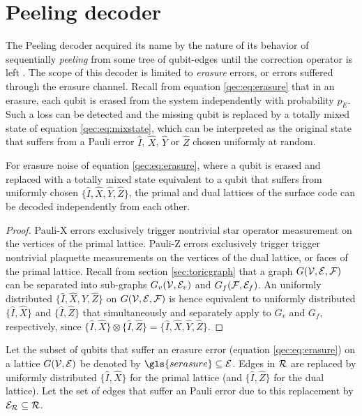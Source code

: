 \section{Peeling decoder}
The Peeling decoder acquired its name by the nature of its behavior of sequentially \emph{peeling} from some tree of qubit-edges until the correction operator is left \cite{delfosse2017linear}. The scope of this decoder is limited to \emph{erasure} errors, or errors suffered through the erasure channel. Recall from equation \eqref{qec:eq:erasure} that in an erasure, each qubit is erased from the system independently with probability $p_E$. Such a loss can be detected and the missing qubit is replaced by a totally mixed state of equation \eqref{qec:eq:mixstate}, which can be interpreted as the original state that suffers from a Pauli error $\hat{I}$, $\hat{X}$, $\hat{Y}$ or $\hat{Z}$ chosen uniformly at random.
\begin{theorem}\label{the:independentxy}
  For erasure noise of equation \eqref{qec:eq:erasure}, where a qubit is erased and replaced with a totally mixed state equivalent to a qubit that suffers from uniformly chosen $\{\hat{I},\hat{X},\hat{Y},\hat{Z}\}$, the primal and dual lattices of the surface code can be decoded independently from each other.
\end{theorem}
\begin{proof}
  Pauli-X errors exclusively trigger nontrivial star operator measurement on the vertices of the primal lattice. Pauli-Z errors exclusively trigger trigger nontrivial plaquette measurements on the vertices of the dual lattice, or faces of the primal lattice. Recall from section \ref{sec:toricgraph} that a graph $G(\mathcal{V},\mathcal{E},\mathcal{F})$ can be separated into sub-graphs $G_v(\mathcal{V},\mathcal{E}_v)$ and $G_f(\mathcal{F},\mathcal{E}_f)$. An uniformly distributed $\{\hat{I},\hat{X},\hat{Y},\hat{Z}\}$ on $G(\mathcal{V},\mathcal{E},\mathcal{F})$ is hence equivalent to uniformly distributed $\{\hat{I}, \hat{X}\}$ and $\{\hat{I}, \hat{Z}\}$ that simultaneously and separately apply to $G_v$ and $G_f$, respectively, since $\{\hat{I}, \hat{X}\} \otimes \{\hat{I}, \hat{Z}\}=\{\hat{I},\hat{X},\hat{Y},\hat{Z}\}$.
\end{proof}
\begin{definition}\label{def:erasure}
  Let the subset of qubits that suffer an erasure error (equation \eqref{qec:eq:erasure}) on a lattice $G(\mathcal{V},\mathcal{E})$ be denoted by $\gls{serasure}\subseteq \m{E}$. Edges in $\mathcal{R}$ are replaced by uniformly distributed $\{\hat{I}, \hat{X}\}$ for the primal lattice (and $\{\hat{I}, \hat{Z}\}$ for the dual lattice). Let the set of edges that suffer an Pauli error due to this replacement by $\mathcal{E}_{\mathcal{R}}\subseteq \mathcal{R}$.
\end{definition}

